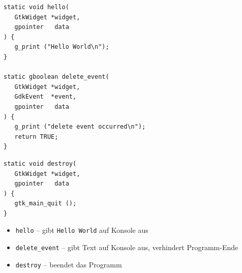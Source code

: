 
\begin{frame}[fragile]
%
\begin{minipage}{.5\linewidth}
\begin{codebox}
\begin{verbatim}
static void hello(
   GtkWidget *widget,
   gpointer   data
) {
   g_print ("Hello World\n");
}

static gboolean delete_event( 
   GtkWidget *widget,
   GdkEvent  *event,
   gpointer   data
) {
   g_print ("delete event occurred\n");
   return TRUE;
}
\end{verbatim}
\end{codebox}
\end{minipage}
%
\begin{minipage}{.49\linewidth}
\begin{codebox}[... Fortsetzung]
\begin{verbatim}
static void destroy( 
   GtkWidget *widget,
   gpointer   data 
) {
   gtk_main_quit ();
}
\end{verbatim}
\end{codebox}

\vspace{3pt}
\begin{itemize}
\item \texttt{hello} -- gibt \texttt{Hello World} auf Konsole aus
\item \texttt{delete\_event} -- gibt Text auf Konsole aus, verhindert Programm-Ende
\item \texttt{destroy} -- beendet das Programm
\end{itemize}
\end{minipage}
%
\end{frame}


